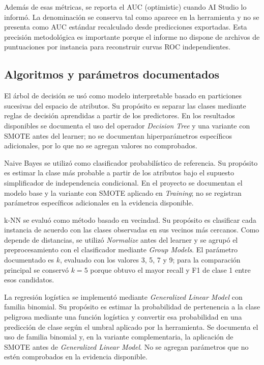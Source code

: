 \documentclass[12pt,a4paper]{article}
\begin{document}
Además de esas métricas, se reporta el AUC (optimistic) cuando AI Studio lo informó. La denominación se conserva tal como aparece en la herramienta y no se presenta como AUC estándar recalculado desde predicciones exportadas. Esta precisión metodológica es importante porque el informe no dispone de archivos de puntuaciones por instancia para reconstruir curvas ROC independientes.

\subsection{Algoritmos y parámetros documentados}
El árbol de decisión se usó como modelo interpretable basado en particiones sucesivas del espacio de atributos. Su propósito es separar las clases mediante reglas de decisión aprendidas a partir de los predictores. En los resultados disponibles se documenta el uso del operador \textit{Decision Tree} y una variante con SMOTE antes del learner; no se documentan hiperparámetros específicos adicionales, por lo que no se agregan valores no comprobados.

Naive Bayes se utilizó como clasificador probabilístico de referencia. Su propósito es estimar la clase más probable a partir de los atributos bajo el supuesto simplificador de independencia condicional. En el proyecto se documentan el modelo base y la variante con SMOTE aplicado en \textit{Training}; no se registran parámetros específicos adicionales en la evidencia disponible.

k-NN se evaluó como método basado en vecindad. Su propósito es clasificar cada instancia de acuerdo con las clases observadas en sus vecinos más cercanos. Como depende de distancias, se utilizó \textit{Normalize} antes del learner y se agrupó el preprocesamiento con el clasificador mediante \textit{Group Models}. El parámetro documentado es $k$, evaluado con los valores 3, 5, 7 y 9; para la comparación principal se conservó $k=5$ porque obtuvo el mayor recall y F1 de clase 1 entre esos candidatos.

La regresión logística se implementó mediante \textit{Generalized Linear Model} con familia binomial. Su propósito es estimar la probabilidad de pertenencia a la clase peligrosa mediante una función logística y convertir esa probabilidad en una predicción de clase según el umbral aplicado por la herramienta. Se documenta el uso de familia binomial y, en la variante complementaria, la aplicación de SMOTE antes de \textit{Generalized Linear Model}. No se agregan parámetros que no estén comprobados en la evidencia disponible.
\end{document}

